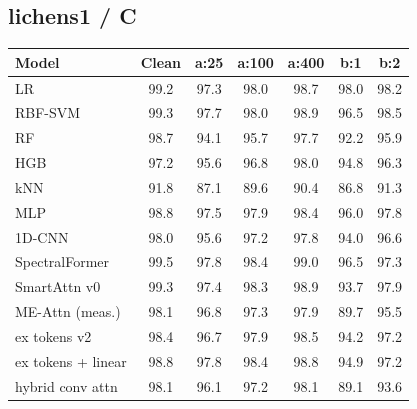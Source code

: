 \subsection*{lichens1 / C}
\small
\begin{tabular}{lcccccc}
\toprule
Model & Clean & a:25 & a:100 & a:400 & b:1 & b:2 \\
\midrule
LR & 99.2 & 97.3 & 98.0 & 98.7 & 98.0 & 98.2 \\
RBF-SVM & 99.3 & 97.7 & 98.0 & 98.9 & 96.5 & 98.5 \\
RF & 98.7 & 94.1 & 95.7 & 97.7 & 92.2 & 95.9 \\
HGB & 97.2 & 95.6 & 96.8 & 98.0 & 94.8 & 96.3 \\
kNN & 91.8 & 87.1 & 89.6 & 90.4 & 86.8 & 91.3 \\
MLP & 98.8 & 97.5 & 97.9 & 98.4 & 96.0 & 97.8 \\
1D-CNN & 98.0 & 95.6 & 97.2 & 97.8 & 94.0 & 96.6 \\
SpectralFormer & 99.5 & 97.8 & 98.4 & 99.0 & 96.5 & 97.3 \\
SmartAttn v0 & 99.3 & 97.4 & 98.3 & 98.9 & 93.7 & 97.9 \\
ME-Attn (meas.) & 98.1 & 96.8 & 97.3 & 97.9 & 89.7 & 95.5 \\
ex tokens v2 & 98.4 & 96.7 & 97.9 & 98.5 & 94.2 & 97.2 \\
ex tokens + linear & 98.8 & 97.8 & 98.4 & 98.8 & 94.9 & 97.2 \\
hybrid conv attn & 98.1 & 96.1 & 97.2 & 98.1 & 89.1 & 93.6 \\
\bottomrule
\end{tabular}
